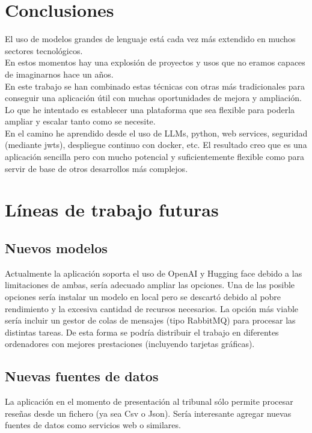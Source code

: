 
\section{Conclusiones}
El uso de modelos grandes de lenguaje está cada vez más extendido en muchos sectores tecnológicos.\\
En estos momentos hay una explosión de proyectos y usos que no eramos capaces de imaginarnos hace un años.\\
En este trabajo se han combinado estas técnicas con otras más tradicionales para 
conseguir una aplicación útil con muchas oportunidades de mejora y ampliación.\\
Lo que he intentado es establecer una plataforma que sea flexible para poderla ampliar y 
escalar tanto como se necesite.\\
En el camino he aprendido desde el uso de LLMs, python, web services, seguridad (mediante jwts), 
despliegue continuo con docker, etc.
El resultado creo que es una aplicación sencilla pero con mucho potencial y suficientemente 
flexible como para servir de base de otros desarrollos más complejos.

\section{Líneas de trabajo futuras}

\subsection{Nuevos modelos}
Actualmente la aplicación soporta el uso de OpenAI y Hugging face debido a las limitaciones de ambas,
sería adecuado ampliar las opciones. Una de las posible opciones sería instalar un modelo en local 
pero se descartó debido al pobre rendimiento y la excesiva cantidad de recursos necesarios.
La opción más viable sería incluir un gestor de colas de mensajes (tipo RabbitMQ) para procesar las distintas tareas.
De esta forma se podría distribuir el trabajo en diferentes ordenadores con mejores prestaciones 
(incluyendo tarjetas gráficas).

\subsection{Nuevas fuentes de datos}
La aplicación en el momento de presentación al tribunal sólo permite procesar reseñas desde un fichero (ya sea Csv o Json).
Sería interesante agregar nuevas fuentes de datos como servicios web o similares.

